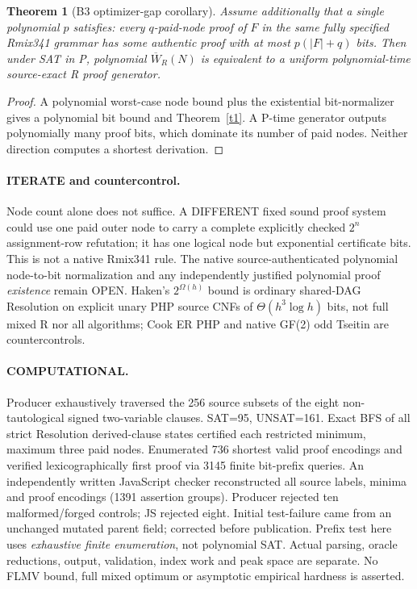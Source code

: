 \documentclass[11pt]{article}
\newtheorem{theorem}{Theorem}
\begin{document}
\begin{theorem}[B3 optimizer-gap corollary]\label{t2}
Assume additionally that a single polynomial $p$ satisfies: every $q$-paid-node proof of $F$ in the \emph{same fully specified Rmix341 grammar} has some authentic proof with at most $p(|F|+q)$ bits. Then under SAT in P, polynomial $\overline W_R(N)$ is equivalent to a uniform polynomial-time source-exact R proof generator.
\end{theorem}
\begin{proof}
A polynomial worst-case node bound plus the existential bit-normalizer gives a polynomial bit bound and Theorem~\ref{t1}. A P-time generator outputs polynomially many proof bits, which dominate its number of paid nodes. Neither direction computes a shortest derivation.
\end{proof}
\paragraph{ITERATE and countercontrol.} Node count alone does not suffice. A DIFFERENT fixed sound proof system could use one paid outer node to carry a complete explicitly checked $2^n$ assignment-row refutation; it has one logical node but exponential certificate bits. This is not a native Rmix341 rule. The native source-authenticated polynomial node-to-bit normalization and any independently justified polynomial proof \emph{existence} remain OPEN. Haken's $2^{\Omega(h)}$ bound is ordinary shared-DAG Resolution on explicit unary PHP source CNFs of $\Theta(h^3\log h)$ bits, not full mixed R nor all algorithms; Cook ER PHP and native GF(2) odd Tseitin are countercontrols.
\paragraph{COMPUTATIONAL.} Producer exhaustively traversed the 256 source subsets of the eight non-tautological signed two-variable clauses. SAT=95, UNSAT=161. Exact BFS of all strict Resolution derived-clause states certified each restricted minimum, maximum three paid nodes. Enumerated 736 shortest valid proof encodings and verified lexicographically first proof via 3145 finite bit-prefix queries. An independently written JavaScript checker reconstructed all source labels, minima and proof encodings (1391 assertion groups). Producer rejected ten malformed/forged controls; JS rejected eight. Initial test-failure came from an unchanged mutated parent field; corrected before publication. Prefix test here uses \emph{exhaustive finite enumeration}, not polynomial SAT. Actual parsing, oracle reductions, output, validation, index work and peak space are separate. No FLMV bound, full mixed optimum or asymptotic empirical hardness is asserted.
\end{document}
